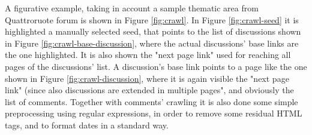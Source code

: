 A figurative example, taking in account a sample thematic area from Quattroruote forum is shown in Figure \ref{fig:crawl}. In Figure \ref{fig:crawl-seed} it is highlighted a manually selected seed, that points to the list of discussions shown in Figure \ref{fig:crawl-base-discussion}, where the actual discussions' base links are the one highlighted. It is also shown the "next page link" used for reaching all pages of the discussions' list. A discussion's base link points to a page like the one shown in Figure \ref{fig:crawl-discussion}, where it is again visible the "next page link" (since also discussions are extended in multiple pages", and obviously the list of comments.
Together with comments' crawling it is also done some simple preprocessing using regular expressions, in order to remove some residual \ac{HTML} tags, and to format dates in a standard way.

